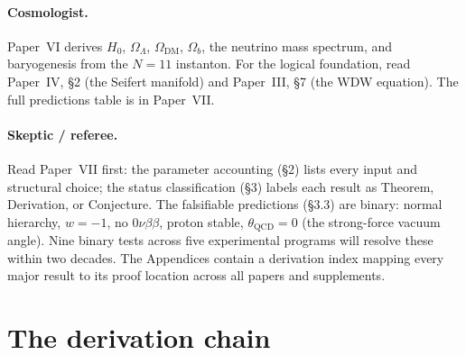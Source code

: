 \paragraph{Cosmologist.}
Paper~VI derives $H_0$, $\Omega_\Lambda$, $\Omega_{\mathrm{DM}}$,
$\Omega_b$, the neutrino mass spectrum, and baryogenesis from
the $N = 11$ instanton.
For the logical foundation, read Paper~IV, \S2 (the Seifert
manifold) and Paper~III, \S7 (the WDW equation).
The full predictions table is in Paper~VII.

\paragraph{Skeptic / referee.}
Read Paper~VII first: the parameter accounting (\S2) lists
every input and structural choice; the status classification
(\S3) labels each result as Theorem, Derivation, or Conjecture.
The falsifiable predictions (\S3.3) are binary: normal hierarchy,
$w = -1$, no $0\nu\beta\beta$, proton stable,
$\theta_{\mathrm{QCD}} = 0$ (the strong-force vacuum angle).
Nine binary tests across five experimental programs
will resolve these within two decades.
The Appendices contain a derivation index mapping every
major result to its proof location across all papers and
supplements.

\section{The derivation chain}

